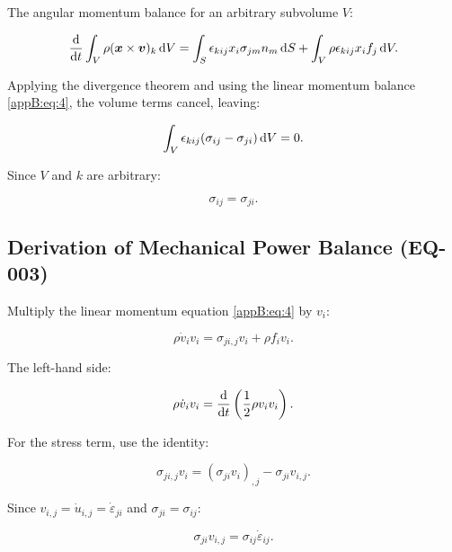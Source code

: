 The angular momentum balance for an arbitrary subvolume $V$:

\begin{equation}
\frac{\mathrm{d}}{\mathrm{d} t}\int_V \rho (\boldsymbol{x} \times \boldsymbol{v})_k \, \mathrm{d} V
=
\int_S \epsilon_{kij} x_i \sigma_{jm} n_m \, \mathrm{d} S
+
\int_V \rho \epsilon_{kij} x_i f_j \, \mathrm{d} V.
\label{appB:eq:5}
\end{equation}

Applying the divergence theorem and using the linear momentum balance \eqref{appB:eq:4}, the volume terms cancel, leaving:

\begin{equation}
\int_V \epsilon_{kij} (\sigma_{ij} - \sigma_{ji}) \, \mathrm{d} V = 0.
\label{appB:eq:6}
\end{equation}

Since $V$ and $k$ are arbitrary:

\begin{equation}
\sigma_{ij} = \sigma_{ji}.
\label{appB:eq:7}
\end{equation}

\subsection{Derivation of Mechanical Power Balance (EQ-003)}

Multiply the linear momentum equation \eqref{appB:eq:4} by $v_i$:

\begin{equation}
\rho \dot{v}_i v_i = \sigma_{ji,j} v_i + \rho f_i v_i.
\label{appB:eq:8}
\end{equation}

The left-hand side:

\begin{equation}
\rho \dot{v}_i v_i = \frac{\mathrm{d}}{\mathrm{d} t}\left(\frac{1}{2}\rho v_i v_i\right).
\label{appB:eq:9}
\end{equation}

For the stress term, use the identity:

\begin{equation}
\sigma_{ji,j} v_i = (\sigma_{ji} v_i)_{,j} - \sigma_{ji} v_{i,j}.
\label{appB:eq:10}
\end{equation}

Since $v_{i,j} = \dot{u}_{i,j} = \dot{\varepsilon}_{ji}$ and $\sigma_{ji} = \sigma_{ij}$:

\begin{equation}
\sigma_{ji} v_{i,j} = \sigma_{ij} \dot{\varepsilon}_{ij}.
\label{appB:eq:11}
\end{equation}

